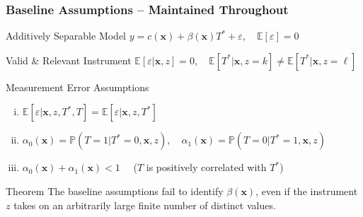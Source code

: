 \documentclass{beamer}
\begin{document}
\begin{frame}
  \frametitle{Baseline Assumptions -- Maintained Throughout}

  \small

  \begin{block}{Additively Separable Model}
    $y = c(\mathbf{x}) + \beta(\mathbf{x}) T^* + \varepsilon, \quad \mathbb{E}[ \varepsilon] = 0$ 
  \end{block}

  \begin{block}{Valid \& Relevant Instrument}
    $\mathbb{E}[\varepsilon|\mathbf{x},z] = 0, \quad \mathbb{E}\left[ T^*|\mathbf{x},z=k \right] \neq \mathbb{E}\left[ T^*|\mathbf{x},z=\ell \right]$
  \end{block}

  \begin{block}{Measurement Error Assumptions}
    \vspace{-0.5em}
  \begin{enumerate}[(i)] 
    \item  $\mathbb{E}[\varepsilon|\mathbf{x},z,T^*,T] = \mathbb{E}[\varepsilon|\mathbf{x},z, T^*]$
    \item $\alpha_0(\mathbf{x}) = \mathbb{P}(T=1|T^*=0,\mathbf{x},z), \quad \alpha_1(\mathbf{x}) = \mathbb{P}(T=0|T^*=1,\mathbf{x},z)$
    \item  $\alpha_0(\mathbf{x}) + \alpha_1(\mathbf{x}) < 1 \quad$ ($T$ is positively correlated with $T^*$)
  \end{enumerate}
  \end{block}

  \vspace{-1em}

  \begin{alertblock}{Theorem}
    The baseline assumptions fail to identify $\beta(\mathbf{x})$, even if the instrument $z$ takes on an arbitrarily large finite number of distinct values.
  \end{alertblock}
\end{frame}
\end{document}
